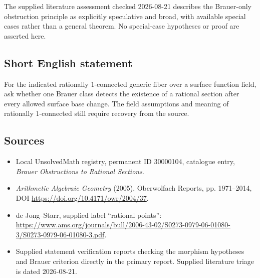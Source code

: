 \documentclass[11pt]{article}
\begin{document}
The supplied literature assessment checked 2026-08-21 describes the Brauer-only obstruction principle as explicitly speculative and broad, with available special cases rather than a general theorem. No special-case hypotheses or proof are asserted here.
\subsection{Short English statement}
For the indicated rationally \(1\)-connected generic fiber over a surface function field, ask whether one Brauer class detects the existence of a rational section after every allowed surface base change. The field assumptions and meaning of rationally \(1\)-connected still require recovery from the source.
\subsection{Sources}
\begin{itemize}
\item Local UnsolvedMath registry, permanent ID 30000104, catalogue entry, \emph{Brauer Obstructions to Rational Sections}.
\item \emph{Arithmetic Algebraic Geometry} (2005), Oberwolfach Reports, pp. 1971--2014, DOI \url{https://doi.org/10.4171/owr/2004/37}.
\item de Jong--Starr, supplied label ``rational points'': \url{https://www.ams.org/journals/bull/2006-43-02/S0273-0979-06-01080-3/S0273-0979-06-01080-3.pdf}.
\item Supplied statement verification reports checking the morphism hypotheses and Brauer criterion directly in the primary report. Supplied literature triage is dated 2026-08-21.
\end{itemize}
\end{document}
